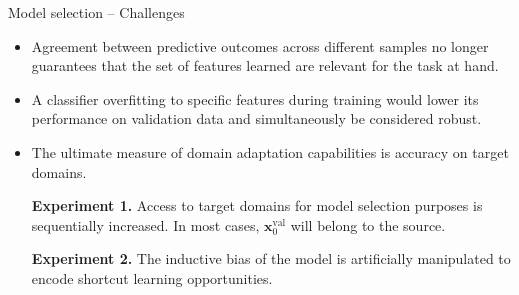 \begin{frame}
    \centering
    \Huge{\insertsection}  %
\end{frame}

\begin{frame}{Model selection -- Challenges}
	\begin{itemize}
		\item Agreement between predictive outcomes across different samples no longer
		guarantees that the set of features learned are relevant for the task at hand.
		\item A classifier overfitting to specific features during training would lower
		its performance on validation data and simultaneously be considered robust.
		\item The ultimate measure of domain adaptation capabilities is accuracy
		on target domains.

		\vspace{0.5cm}
		\textbf{Experiment 1.} Access to target domains for model selection purposes is sequentially
		increased. In most cases, $\bm{x}_0^{\text{val}}$ will belong to the source.

		\vspace{0.2cm}
		\textbf{Experiment 2.} The inductive bias of the model is artificially manipulated to
		encode shortcut learning opportunities. 
	\end{itemize}

\end{frame}

